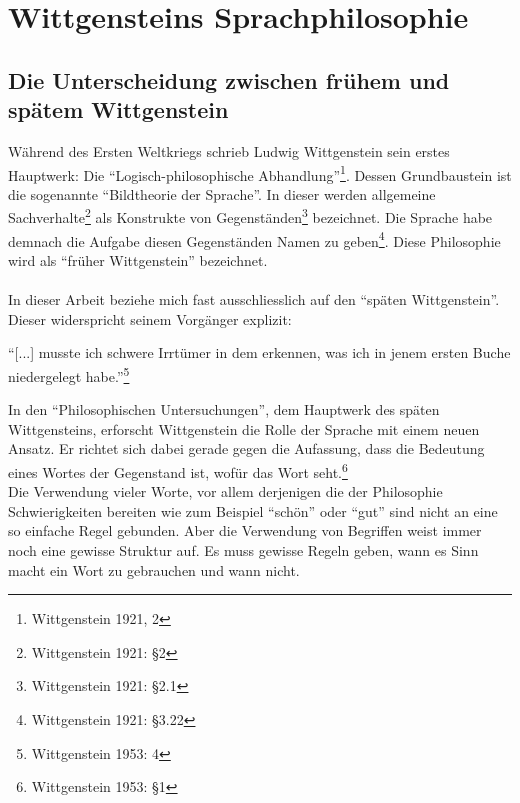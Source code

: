 \documentclass[10pt,a4paper]{article}
\begin{document}
\section{Wittgensteins Sprachphilosophie}

\subsection{Die Unterscheidung zwischen frühem und spätem Wittgenstein}

Während des Ersten Weltkriegs schrieb Ludwig Wittgenstein sein erstes Hauptwerk: Die \enquote{Logisch-philosophische Abhandlung}\footnote{Wittgenstein 1921, 2}. Dessen Grundbaustein ist die sogenannte \enquote{Bildtheorie der Sprache}. In dieser werden allgemeine Sachverhalte\footnote{Wittgenstein 1921: §2} als Konstrukte von Gegenständen\footnote{Wittgenstein 1921: §2.1} bezeichnet. Die Sprache habe demnach die Aufgabe diesen Gegenständen Namen zu geben\footnote{Wittgenstein 1921: §3.22}. Diese Philosophie wird als \enquote{früher Wittgenstein} bezeichnet. \\
\\
In dieser Arbeit beziehe mich fast ausschliesslich auf den \enquote{späten Wittgenstein}. Dieser widerspricht seinem Vorgänger explizit:
\begin{displayquote}
\enquote{[...] musste ich schwere Irrtümer in dem erkennen, was ich in jenem ersten Buche niedergelegt habe.}\footnote{Wittgenstein 1953: 4}
\end{displayquote}
In den \enquote{Philosophischen Untersuchungen}, dem Hauptwerk des späten Wittgensteins, erforscht Wittgenstein die Rolle der Sprache mit einem neuen Ansatz. Er richtet sich dabei gerade gegen die Aufassung, dass die Bedeutung eines Wortes der Gegenstand ist, wofür das Wort seht.\footnote{Wittgenstein 1953: §1} \\
Die Verwendung vieler Worte, vor allem derjenigen die der Philosophie Schwierigkeiten bereiten wie zum Beispiel \enquote{schön} oder \enquote{gut} sind nicht an eine so einfache Regel gebunden. Aber die Verwendung von Begriffen weist immer noch eine gewisse Struktur auf. Es muss gewisse Regeln geben, wann es Sinn macht ein Wort zu gebrauchen und wann nicht.
\end{document}
